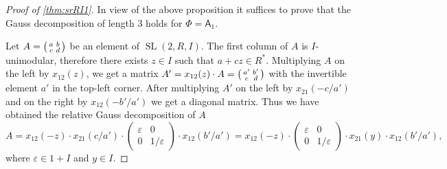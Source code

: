 \documentclass[oneside, 12pt]{amsart}
\theoremstyle{plain}
\numberwithin{equation}{section}
\numberwithin{lemma}{section}
\theoremstyle{definition}
\theoremstyle{remark}
\DeclareMathOperator{\SL}{SL}
\newcommand{\rA}{\mathsf{A}}
\begin{document}
\begin{proof}[Proof of \cref{thm:srRI1}]
In view of the above proposition it suffices to prove that the Gauss decomposition of length $3$ holds for $\Phi=\rA_1$.

Let $A=\begin{psmallmatrix}a & b \\ c & d\end{psmallmatrix}$ be an element of $\SL(2, R, I)$.
The first column of $A$ is $I$-unimodular, therefore there exists $z\in I$ such that $a+cz\in R^*$.
Multiplying $A$ on the left by $x_{12}(z)$, we get a matrix $A'=x_{12}(z)\cdot A=\begin{psmallmatrix}a' & b' \\ c & d\end{psmallmatrix}$ with the invertible  element $a'$ in the top-left corner.
After multiplying $A'$ on the left by $x_{21}(-c/a')$ and on the right by $x_{12}(-b'/a')$ we get a diagonal matrix. 
Thus we have obtained the relative Gauss decomposition of $A$
\begin{equation*}
A=x_{12}(-z)\cdot x_{21}(c/a')\cdot
\begin{pmatrix} \varepsilon & 0 \\ 0 & 1/\varepsilon \end{pmatrix}
\cdot x_{12}(b'/a')=x_{12}(-z)\cdot
\begin{pmatrix} \varepsilon & 0 \\ 0 & 1/\varepsilon \end{pmatrix}
\cdot x_{21}(y) \cdot x_{12}(b'/a'), 
\end{equation*}
where $\varepsilon\in 1+I$ and $y\in I$. \end{proof}
\end{document}
